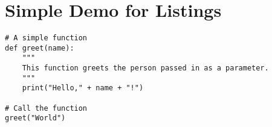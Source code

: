 \documentclass{article}
\begin{document}
\section{Simple Demo for Listings}

\begin{lstlisting}[caption=My first Python code]
# A simple function
def greet(name):
    """
    This function greets the person passed in as a parameter.
    """
    print("Hello," + name + "!")

# Call the function
greet("World")
\end{lstlisting}
\end{document}

